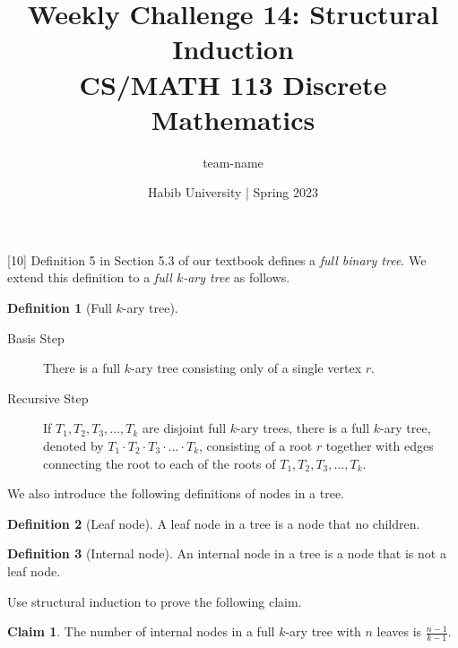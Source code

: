 \documentclass[a4paper,addpoints]{exam}
\title{Weekly Challenge 14: Structural Induction\\CS/MATH 113 Discrete Mathematics}
\author{team-name}  %
\date{Habib University | Spring 2023}
\theoremstyle{definition}
\newtheorem{definition}{Definition}
\theoremstyle{claim}
\newtheorem{claim}{Claim}
\begin{document}
\maketitle

\begin{questions}

[10]
  Definition 5 in Section 5.3 of our textbook defines a \textit{full binary tree}. We extend this definition to a \textit{full $k$-ary tree} as follows.
  \begin{framed}
    \begin{definition}[Full $k$-ary tree]
      \begin{description}
      \item[Basis Step] There is a full $k$-ary tree consisting only of a single vertex $r$.
      \item[Recursive Step]  If $T_1,T_2, T_3,\ldots,T_k$ are disjoint full $k$-ary trees, there is a full $k$-ary tree, denoted by $T_1\cdot T_2\cdot T_3\cdot\ldots\cdot T_k$, consisting of a root $r$ together with edges connecting the root to each of the roots of $T_1,T_2, T_3,\ldots,T_k$.
      \end{description}
    \end{definition}
  \end{framed}
  We also introduce the following definitions of nodes in a tree.
  \begin{definition}[Leaf node]
    A leaf node in a tree is a node that no children.
  \end{definition}
  \begin{definition}[Internal node]
    An internal node in a tree is a node that is not a leaf node.
  \end{definition}

  Use structural induction to prove the following claim.
  \begin{claim}
    The number of internal nodes in a full $k$-ary tree with $n$ leaves is $\frac{n-1}{k-1}$.
  \end{claim}

  \begin{solution}
  \end{solution}

\end{questions}
\end{document}
